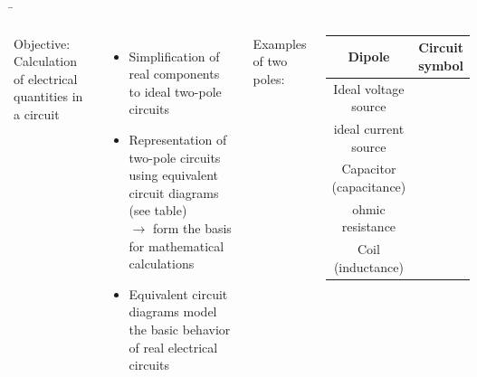 \begin{frame}

	\b{
		\begin{columns}
			
			Objective: Calculation of electrical quantities in a circuit
			
			\vspace{5pt}
			\begin{itemize}
				\item Simplification of real components to ideal two-pole circuits
				\item Representation of two-pole circuits using equivalent circuit diagrams (see table)\\
					$\rightarrow$ form the basis for mathematical calculations
				\item Equivalent circuit diagrams model the basic behavior of real electrical circuits
				      
			\end{itemize}
			
			
			Examples of two poles:
			
			
			\begin{center}
				\begin{tabular}{|c|c|}
					\hline
					Dipole                 	& Circuit symbol                                              \\ \hline
					Ideal voltage source  	&  \\ \hline
					ideal current source    &      \\ \hline
					Capacitor (capacitance) &             \\ \hline
					ohmic resistance     	&     \\ \hline
					Coil (inductance)	  	&                   \\ \hline
				\end{tabular}
			\end{center}
		\end{columns}
		
}
\end{frame}
